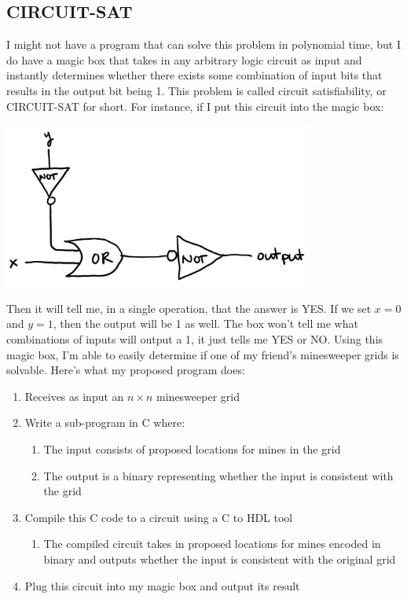 \documentclass{article}
\begin{document}
\subsection{CIRCUIT-SAT}

I might not have a program that can solve this problem in polynomial time, but I do have a magic box that takes in any arbitrary logic circuit as input and instantly determines whether there exists some combination of input bits that results in the output bit being 1. This problem is called circuit satisfiability, or CIRCUIT-SAT for short. For instance, if I put this circuit into the magic box:

\begin{center}
    \includegraphics[width=4in]{images/Minesweeper_fig2.png}
\end{center}

Then it will tell me, in a single operation, that the answer is YES. If we set $x=0$ and $y=1$, then the output will be 1 as well. The box won’t tell me what combinations of inputs will output a 1, it just tells me YES or NO. Using this magic box, I’m able to easily determine if one of my friend’s minesweeper grids is solvable. Here’s what my proposed program does:
\begin{enumerate}
\item Receives as input an $n \times n$ minesweeper grid
\item Write a sub-program in C where:
    \begin{enumerate}
    \item The input consists of proposed locations for mines in the grid
    \item The output is a binary representing whether the input is consistent with the grid
    \end{enumerate}
\item Compile this C code to a circuit using a C to HDL tool
\begin{enumerate}
    \item The compiled circuit takes in proposed locations for mines encoded in binary and outputs whether the input is consistent with the original grid
\end{enumerate}
\item Plug this circuit into my magic box and output its result
\end{enumerate}
\end{document}
